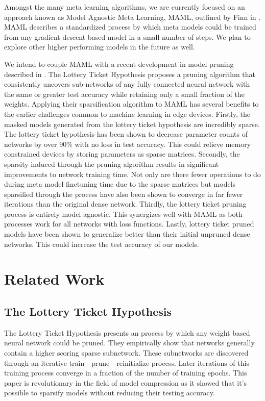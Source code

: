 \documentclass[twocolumn, 10pt]{article}
\begin{document}
Amongst the many meta learning algorithms, we are currently focused on an approach known as Model Agnostic Meta Learning, MAML, outlined by Finn in \cite{finn2017modelagnostic}. MAML describes a standardized process by which meta models could be trained from any gradient descent based model in a small number of steps. We plan to explore other higher performing models in the future as well.

We intend to couple MAML with a recent development in model pruning described in \cite{frankle2019lottery}. The Lottery Ticket Hypothesis proposes a pruning algorithm that consistently uncovers sub-networks of any fully connected neural network with the same or greater test accuracy while retaining only a small fraction of the weights. Applying their sparsification algorithm to MAML has several benefits to the earlier challenges common to machine learning in edge devices. Firstly, the masked models generated from the lottery ticket hypothesis are incredibly sparse. The lottery ticket hypothesis has been shown to decrease parameter counts of networks by over 90\% with no loss in test accuracy. This could relieve memory constrained devices by storing parameters as sparse matrices. Secondly, the sparsity induced through the pruning algorithm results in significant improvements to network training time. Not only are there fewer operations to do during meta model finetuning time due to the sparse matrices but models sparsified through the process have also been shown to converge in far fewer iterations than the original dense network. Thirdly, the lottery ticket pruning process is entirely model agnostic. This synergizes well with MAML as both processes work for all networks with loss functions. Lastly, lottery ticket pruned models have been shown to generalize better than their initial unpruned dense networks. This could increase the test accuracy of our models.

\section{Related Work}

\subsection{The Lottery Ticket Hypothesis\cite{frankle2019lottery}}
The Lottery Ticket Hypothesis presents an process by which any weight based neural network could be pruned. They empirically show that networks generally contain a higher scoring sparse subnetwork. These subnetworks are discovered through an iterative train - prune - reinitialize process. Later iterations of this training process converge in a fraction of the number of training epochs. This paper is revolutionary in the field of model compression as it showed that it's possible to sparsify models without reducing their testing accuracy. 
\end{document}
